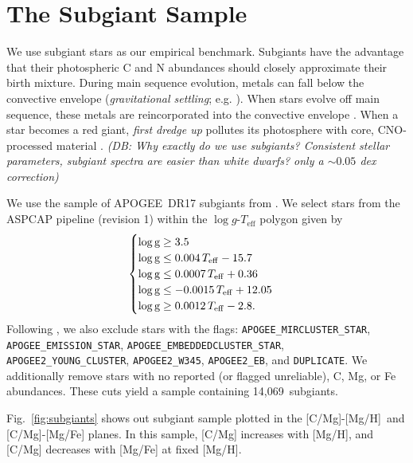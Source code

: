 \documentclass[fleqn,
usenatbib]{mnras}
\newcommand{\nsubgiants}{14,069}
\newcommand{\apogee}{APOGEE}
\newcommand{\caah}{[C/Mg]-[Mg/H]}
\newcommand{\caafe}{[C/Mg]-[Mg/Fe]}
\newcommand{\dbnote}[1]{ {\color{Thistle} \textit{\small (DB: #1)}} }
\begin{document}
\section{The Subgiant Sample}\label{sec:data_selection}




We use subgiant stars as our empirical benchmark.
Subgiants have the advantage that their photospheric C and N abundances should closely approximate their birth mixture.
During main sequence evolution, metals can fall below the convective envelope (\textit{gravitational settling}; e.g. \citealt{turncotte+98}).
When stars evolve off main sequence, these metals are reincorporated into the convective envelope \citep[]{gratton+00, souto19}. 
When a star becomes a red giant, \textit{first dredge up} pollutes its photosphere with core, CNO-processed material
\citep{iben67, KL14}.
\dbnote{Why exactly do we use subgiants? Consistent stellar parameters, subgiant spectra are easier than white dwarfs? only a $\sim 0.05$ dex correction}

We use the sample of \apogee\ DR17 subgiants from \citet{jack}. We select stars from the ASPCAP pipeline (revision 1) within the $\log g$-$T_\text{eff}$ polygon given by
 \begin{equation}
    \begin{cases} \label{eq:subgiant_selection}
        \log \text{g} \geq 3.5 \\
        \log \text{g} \leq 0.004\,T_{\rm eff} - 15.7 \\
        \log \text{g} \leq 0.0007\,T_{\rm eff} + 0.36 \\
        \log \text{g} \leq -0.0015\,T_{\rm eff} + 12.05 \\
        \log \text{g} \geq 0.0012\,T_{\rm eff} - 2.8. \\
    \end{cases}
\end{equation}
Following \citet{jack}, we also exclude stars with the flags:
        \verb|APOGEE_MIRCLUSTER_STAR|,
        \verb|APOGEE_EMISSION_STAR|,
        \verb|APOGEE_EMBEDDEDCLUSTER_STAR|,
        \verb|APOGEE2_YOUNG_CLUSTER|,
        \verb|APOGEE2_W345|,
        \verb|APOGEE2_EB|, and
        \verb|DUPLICATE|.
We additionally remove stars with no reported (or flagged unreliable), C, Mg, or Fe abundances. These cuts yield a sample containing \nsubgiants\ subgiants.


Fig.~\ref{fig:subgiants} shows out subgiant sample plotted in the \caah\ and \caafe{} planes.\footnotemark{} In this sample, [C/Mg] increases with [Mg/H], and [C/Mg] decreases with [Mg/Fe] at fixed [Mg/H]. 
\end{document}
